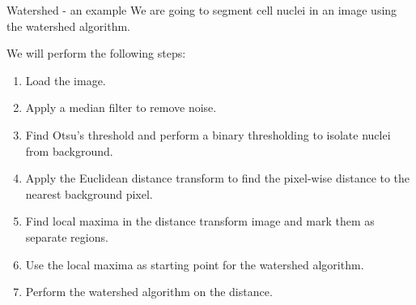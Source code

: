 \documentclass[9pt, aspectratio=169]{beamer}
\begin{document}
\begin{frame}
    {Watershed - an example}
    We are going to segment cell nuclei in an image using the watershed algorithm.

    We will perform the following steps:

    \begin{enumerate}[<+->]
        \item Load the image.
        \item Apply a median filter to remove noise.
        \item Find Otsu's threshold and perform a binary thresholding to isolate nuclei from background.
        \item Apply the Euclidean distance transform to find the pixel-wise distance to the nearest background pixel.
        \item Find local maxima in the distance transform image and mark them as separate regions.
        \item Use the local maxima as starting point for the watershed algorithm.
        \item Perform the watershed algorithm on the distance.
    \end{enumerate}
\end{frame}
\end{document}
